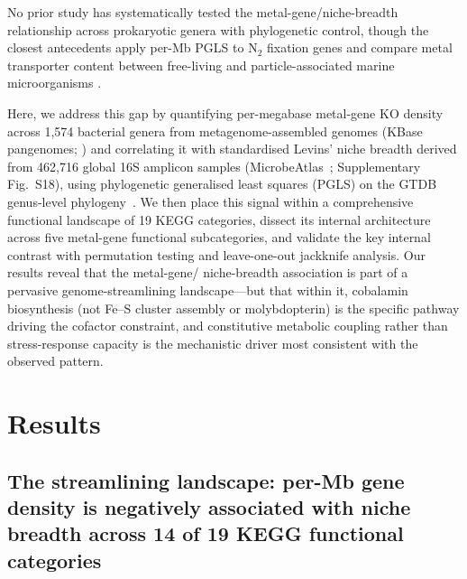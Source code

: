 \documentclass[times]{zHenriquesLab-StyleBioRxiv}
\begin{document}
No prior study has systematically tested the metal-gene/niche-breadth relationship
across prokaryotic genera with phylogenetic control, though the closest antecedents
apply per-Mb PGLS to N$_2$ fixation genes \cite{sobol2026} and compare metal
transporter content between free-living and particle-associated marine
microorganisms \cite{leu2022}.

Here, we address this gap by quantifying per-megabase metal-gene KO density
across 1,574 bacterial genera from metagenome-assembled genomes (KBase
pangenomes; \cite{arkin2018}) and correlating it with standardised Levins'
niche breadth derived from 462,716 global 16S amplicon samples
(MicrobeAtlas~\cite{rodrigues2026}; Supplementary Fig.~S18), using phylogenetic generalised least
squares (PGLS) on the GTDB genus-level phylogeny~\cite{parks2022}. We then place this signal
within a comprehensive functional landscape of 19 KEGG categories, dissect its
internal architecture across five metal-gene functional subcategories, and
validate the key internal contrast with permutation testing and
leave-one-out jackknife analysis. Our results reveal that the metal-gene/
niche-breadth association is part of a pervasive genome-streamlining
landscape---but that within it, cobalamin biosynthesis (not Fe--S cluster
assembly or molybdopterin) is the specific pathway driving the cofactor
constraint, and constitutive metabolic coupling rather than stress-response
capacity is the mechanistic driver most consistent with the observed pattern.



\section*{Results}
\setcounter{subsection}{0}


\subsection{The streamlining landscape: per-Mb gene density is negatively
associated with niche breadth across 14 of 19 KEGG functional categories}
\label{ss:landscape}
\end{document}
